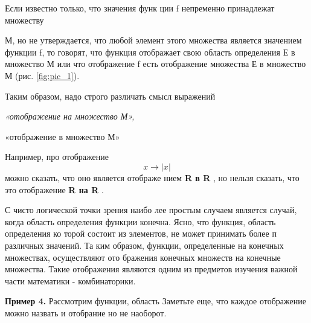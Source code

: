 \begin{multicols}{2}
Если известно только, что значения функ
ции f непременно принадлежат множеству
\begin{figure}[H]

\caption{}
\label{fig:pic_1 }
\end{figure}
М, но не утверждается, что любой элемент
этого множества является значением функции f,
 то говорят, что функция отображает
свою область определения Е в множество М
или что отображение f есть отображение
множества Е в множество М (рис. \ref{fig:pic_1}).

Таким образом, надо строго различать
смысл выражений

{\em «отображение на множество М»,

«отображение в множество М»}

Например, про отображение
$$x \rightarrow |x|$$
можно сказать, что оно является отображе
нием {\bf R в R }, но нельзя сказать, что это отображение {\bf R на R} .

С чисто логической точки зрения наибо
лее простым случаем является случай, когда
область определения функции конечна.
Ясно, что функция, область определения ко
торой состоит из элементов, не может
принимать более п различных значений. Та
ким образом, функции, определенные на
конечных множествах, осуществляют ото
бражения конечных множеств на конечные
множества. Такие отображения являются
одним из предметов изучения важной части
математики - комбинаторики.

{ \bf Пример 4.} Рассмотрим функции, область
Заметьте еще, что каждое отображение можно
назвать и отобрание
но не наоборот.

\end{multicols}











